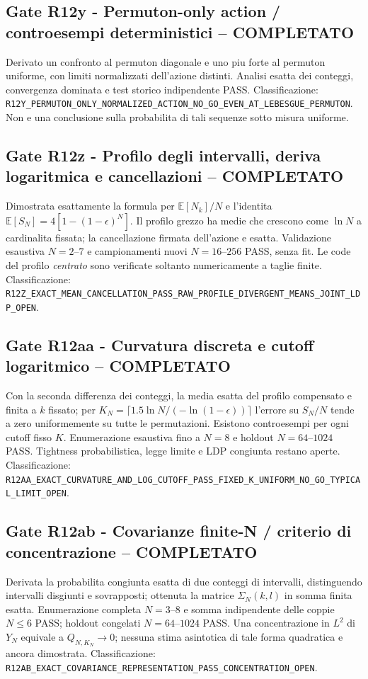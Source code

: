 \documentclass[11pt,a4paper]{article}
\begin{document}
\subsection*{Gate R12y - Permuton-only action / controesempi deterministici -- COMPLETATO}
Derivato un confronto al permuton diagonale e uno piu forte al permuton uniforme, con limiti normalizzati dell'azione distinti. Analisi esatta dei conteggi, convergenza dominata e test storico indipendente PASS. Classificazione: \nolinkurl{R12Y_PERMUTON_ONLY_NORMALIZED_ACTION_NO_GO_EVEN_AT_LEBESGUE_PERMUTON}. Non e una conclusione sulla probabilita di tali sequenze sotto misura uniforme.

\subsection*{Gate R12z - Profilo degli intervalli, deriva logaritmica e cancellazioni -- COMPLETATO}
Dimostrata esattamente la formula per $\mathbb E[N_k]/N$ e l'identita $\mathbb E[S_N]=4[1-(1-\epsilon)^N]$. Il profilo grezzo ha medie che crescono come $\ln N$ a cardinalita fissata; la cancellazione firmata dell'azione e esatta. Validazione esaustiva $N=2$--$7$ e campionamenti nuovi $N=16$--$256$ PASS, senza fit. Le code del profilo \emph{centrato} sono verificate soltanto numericamente a taglie finite. Classificazione: \nolinkurl{R12Z_EXACT_MEAN_CANCELLATION_PASS_RAW_PROFILE_DIVERGENT_MEANS_JOINT_LDP_OPEN}.

\subsection*{Gate R12aa - Curvatura discreta e cutoff logaritmico -- COMPLETATO}
Con la seconda differenza dei conteggi, la media esatta del profilo compensato e finita a $k$ fissato; per $K_N=\lceil1.5\ln N/(-\ln(1-\epsilon))\rceil$ l'errore su $S_N/N$ tende a zero uniformemente su tutte le permutazioni. Esistono controesempi per ogni cutoff fisso $K$. Enumerazione esaustiva fino a $N=8$ e holdout $N=64$--$1024$ PASS. Tightness probabilistica, legge limite e LDP congiunta restano aperte. Classificazione: \nolinkurl{R12AA_EXACT_CURVATURE_AND_LOG_CUTOFF_PASS_FIXED_K_UNIFORM_NO_GO_TYPICAL_LIMIT_OPEN}.

\subsection*{Gate R12ab - Covarianze finite-N / criterio di concentrazione -- COMPLETATO}
Derivata la probabilita congiunta esatta di due conteggi di intervalli, distinguendo intervalli disgiunti e sovrapposti; ottenuta la matrice $\Sigma_N(k,l)$ in somma finita esatta. Enumerazione completa $N=3$--$8$ e somma indipendente delle coppie $N\le6$ PASS; holdout congelati $N=64$--$1024$ PASS. Una concentrazione in $L^2$ di $Y_N$ equivale a $Q_{N,K_N}\to0$; nessuna stima asintotica di tale forma quadratica e ancora dimostrata. Classificazione: \nolinkurl{R12AB_EXACT_COVARIANCE_REPRESENTATION_PASS_CONCENTRATION_OPEN}.
\end{document}
